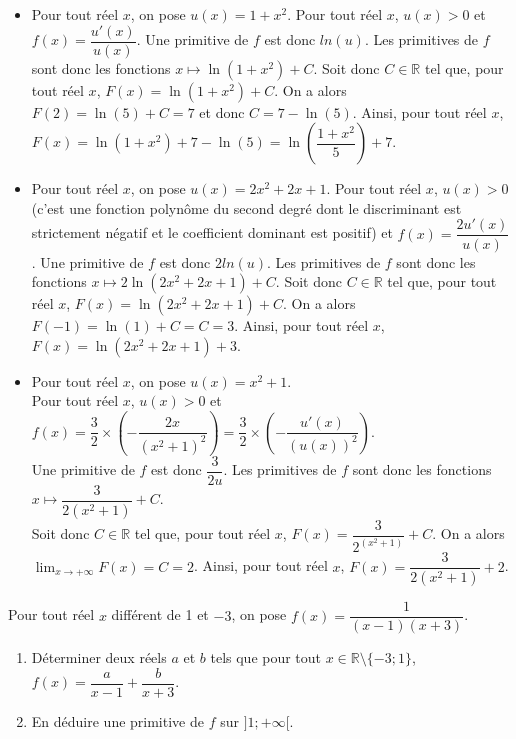 \documentclass[11pt,fleqn, openany]{book} %
\begin{document}
\begin{solution}
\begin{itemize}
\item Pour tout réel \(x\), on pose \(u(x)=1+x^2\). Pour tout réel \(x\), \(u(x)>0\) et \(f(x)=\dfrac{u'(x)}{u(x)}\). Une primitive de \(f\) est donc \(ln(u)\). Les primitives de \(f\) sont donc les fonctions \(x\mapsto \ln(1+x^2)+C\). Soit donc \(C\in\mathbb{R}\) tel que, pour tout réel \(x\), \(F(x)=\ln(1+x^2)+C\). On a alors \(F(2)=\ln(5)+C=7\) et donc \(C=7-\ln(5)\). Ainsi, pour tout réel \(x\), \(F(x)=\ln(1+x^2)+7-\ln(5)=\ln\left(\dfrac{1+x^2}{5}\right)+7\).
\vskip5pt
\item Pour tout réel \(x\), on pose \(u(x)=2x^2+2x+1\). Pour tout réel \(x\), \(u(x)>0\) (c'est une fonction polynôme du second degré dont le discriminant est strictement négatif et le coefficient dominant est positif) et \(f(x)=\dfrac{2u'(x)}{u(x)}\). Une primitive de \(f\) est donc \(2ln(u)\). Les primitives de \(f\) sont donc les fonctions \(x\mapsto 2\ln(2x^2+2x+1)+C\). Soit donc \(C\in\mathbb{R}\) tel que, pour tout réel \(x\), \(F(x)=\ln(2x^2+2x+1)+C\). On a alors \(F(-1)=\ln(1)+C=C=3\). Ainsi, pour tout réel \(x\), \(F(x)=\ln(2x^2+2x+1)+3\).
\vskip5pt
\item Pour tout réel \(x\), on pose \(u(x)=x^2+1\). \\ Pour tout réel \(x\), \(u(x)>0\) et \(f(x)=\dfrac{3}{2} \times \left(-\dfrac{2x}{(x^2+1)^2}\right)=\dfrac{3}{2}\times \left(-\dfrac{u'(x)}{(u(x))^2}\right)\). \\Une primitive de \(f\) est donc \(\dfrac{3}{2u}\). Les primitives de \(f\) sont donc les fonctions \(x\mapsto \dfrac{3}{2(x^2+1)}+C\). \\Soit donc \(C\in\mathbb{R}\) tel que, pour tout réel \(x\), \(F(x)=\dfrac{3}{2^(x^2+1)}+C\). On a alors \(\displaystyle\lim_{x \to +\infty}F(x)=C=2\). Ainsi, pour tout réel \(x\), \(F(x)=\dfrac{3}{2(x^2+1)}+2\).\end{itemize}\end{solution}




\begin{exercise}[topic=diff02]Pour tout réel $x$ différent de 1 et $-3$, on pose $f(x)=\dfrac{1}{(x-1)(x+3)}$.
\begin{enumerate}
\item Déterminer deux réels $a$ et $b$ tels que pour tout $x \in \mathbb{R}\setminus \{ -3;1\}$, $f(x)=\dfrac{a}{x-1}+\dfrac{b}{x+3}$.
\item En déduire une primitive de $f$ sur $]1;+\infty[$.
\end{enumerate}

\end{exercise}
\end{document}
